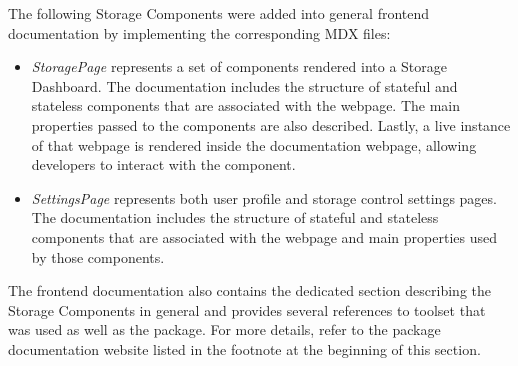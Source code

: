 The following Storage Components were added into general frontend documentation by implementing the corresponding MDX files:
\begin{itemize}
    \item \textit{StoragePage} represents a set of components rendered into a Storage Dashboard. The documentation includes the structure of stateful and stateless components that are associated with the webpage. The main properties passed to the components are also described. Lastly, a live instance of that webpage is rendered inside the documentation webpage, allowing developers to interact with the component.
    \item \textit{SettingsPage} represents both user profile and storage control settings pages. The documentation includes the structure of stateful and stateless components that are associated with the webpage and main properties used by those components. 
\end{itemize}

The frontend documentation also contains the dedicated section describing the Storage Components in general and provides several references to \solid{} toolset that was used as well as the \lpas{} package. For more details, refer to the package documentation website listed in the footnote at the beginning of this section.



